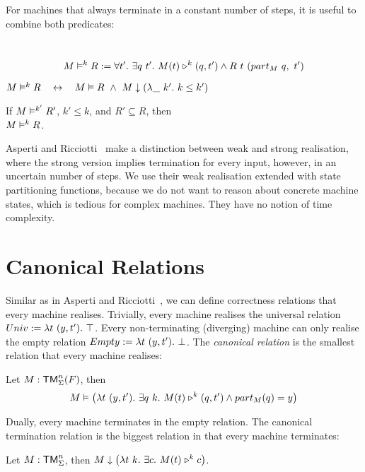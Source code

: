 For machines that always terminate in a constant number of steps, it is useful to combine both predicates:
\begin{definition}
  \label{def:RealiseIn}
  ~
  \[
    M \mathrel{\vDash^{k}} R :=
    \forall t'.~
    \exists q~t'.~
    M(t) \mathrel{\triangleright}^k(q, t') \land R~t~(part_M~q,~t')
  \]
\end{definition}

\begin{lemma}
  \label{lem:Realise_total}
  $
    M \mathrel{\vDash^{k}} R
    \quad\mathbin{\leftrightarrow}\quad
    M \mathrel{\vDash} R ~\land~
    M \mathrel{\downarrow} (\lambda \_~k'.~k \le k')
  $
\end{lemma}

\begin{lemma}
  \label{lem:RealiseIn_monotone}
  If $M \mathrel{\vDash^{k'}} R'$, $k' \leq k$, and $R' \subseteq R$, then \\
  $M \mathrel{\vDash^{k}} R$.
\end{lemma}

Asperti and Ricciotti~\cite{asperti2015} make a distinction between weak and strong realisation, where the strong version implies termination for
every input, however, in an uncertain number of steps.  We use their weak realisation extended with state partitioning functions, because we do not
want to reason about concrete machine states, which is tedious for complex machines.  They have no notion of time complexity.


\section{Canonical Relations}
\label{sec:canonical}

Similar as in Asperti and Ricciotti~\cite{asperti2015}, we can define correctness relations that every machine realises.  Trivially, every machine
realises the universal relation $Univ := \lambda t~(y,t').~\top$.  Every non-terminating (diverging) machine can only realise the empty relation
$Empty := \lambda t~(y,t').~\bot$.  The \textit{canonical relation} is the smallest relation that every machine realises:

\begin{fact}
  Let $M : \mathsf{TM}_\Sigma^n(F)$, then
  \[
    M \mathrel{\vDash} \left( \lambda t~(y,t').~\exists q~k.~M(t) \mathrel{\triangleright}^k (q,t') \land part_M(q) = y \right)
  \]
\end{fact}

Dually, every machine terminates in the empty relation.  The canonical termination relation is the biggest relation in that every machine terminates:
\begin{fact}
  Let $M : \mathsf{TM}_\Sigma^n$, then $M \mathrel{\downarrow} \left( \lambda t~k.~\exists c.~M(t) \mathrel{\triangleright}^k c \right)$.
\end{fact}




